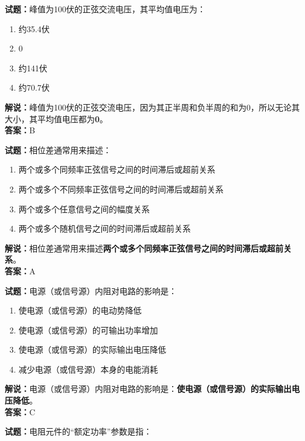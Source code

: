 \documentclass{ctexbook}
\begin{document}
\bigskip


\noindent\textbf{试题：}峰值为100伏的正弦交流电压，其平均值电压为：

\begin{enumerate}[leftmargin=3em]
	\item 约35.4伏
	\item 0
	\item 约141伏
	\item 约70.7伏
\end{enumerate}

\noindent\textbf{解说：}峰值为100伏的正弦交流电压，因为其正半周和负半周的和为0，所以无论其大小，其平均值电压都为\textbf{0}。\\\noindent\textbf{答案：}B


\bigskip


\noindent\textbf{试题：}相位差通常用来描述：

\begin{enumerate}[leftmargin=3em]
	\item 两个或多个同频率正弦信号之间的时间滞后或超前关系
	\item 两个或多个不同频率正弦信号之间的时间滞后或超前关系
	\item 两个或多个任意信号之间的幅度关系
	\item 两个或多个随机信号之间的时间滞后或超前关系
\end{enumerate}

\noindent\textbf{解说：}相位差通常用来描述\textbf{两个或多个同频率正弦信号之间的时间滞后或超前关系}。\\\noindent\textbf{答案：}A


\bigskip


\noindent\textbf{试题：}电源（或信号源）内阻对电路的影响是：

\begin{enumerate}[leftmargin=3em]
	\item 使电源（或信号源）的电动势降低
	\item 使电源（或信号源）的可输出功率增加
	\item 使电源（或信号源）的实际输出电压降低
	\item 减少电源（或信号源）本身的电能消耗
\end{enumerate}

\noindent\textbf{解说：}电源（或信号源）内阻对电路的影响是：\textbf{使电源（或信号源）的实际输出电压降低}。\\\noindent\textbf{答案：}C


\bigskip


\noindent\textbf{试题：}电阻元件的“额定功率”参数是指：
\end{document}
